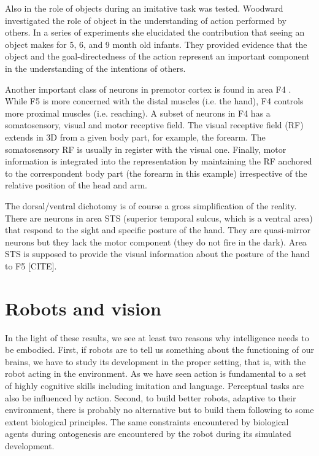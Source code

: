 Also in \cite{wohlsclager02human} the role of objects during an imitative 
task was tested. Woodward \cite{woodward98infants} investigated the role 
of object in the understanding of action performed by others. In a series 
of experiments she elucidated the contribution that seeing an object 
makes for 5, 6, and 9 month old infants. They provided evidence that the 
object and the goal-directedness of the action represent an important 
component in the understanding of the intentions of others.



\ifverbose
Another important class of neurons in premotor cortex is found in area
F4 \cite{fogassi96coding}. While F5 is more concerned with the distal
muscles (i.e. the hand), F4 controls more proximal muscles
(i.e. reaching). A subset of neurons in F4 has a somatosensory, visual
and motor receptive field. The visual receptive field (RF) extends in
3D from a given body part, for example, the forearm. The somatosensory
RF is usually in register with the visual one. Finally, motor
information is integrated into the representation by maintaining the
RF anchored to the correspondent body part (the forearm in this
example) irrespective of the relative position of the head and arm.
\fi

\ifverbose
The dorsal/ventral dichotomy is of course a gross simplification of
the reality.  There are neurons in area STS (superior temporal sulcus,
which is a ventral area) that respond to the sight and specific
posture of the hand. They are quasi-mirror neurons but they lack the
motor component (they do not fire in the dark).  Area STS is supposed
to provide the visual information about the posture of the hand to F5
[CITE].
\fi

\ifverbose

\section{Robots and vision}

In the light of these results, we see at least two reasons why
intelligence needs to be embodied. First, if robots are to tell us
something about the functioning of our brains, we have to study its
development in the proper setting, that is, with the robot acting in
the environment. As we have seen action is fundamental to a set of
highly cognitive skills including imitation and language. Perceptual
tasks are also be influenced by action. Second, to build better
robots, adaptive to their environment, there is probably no
alternative but to build them following to some extent biological
principles. The same constraints encountered by biological agents
during ontogenesis are encountered by the robot during its simulated
development.

